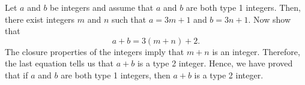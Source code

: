 \begin{list}{\bf{\ref{exer:sec12-typeproof}.}}
\item \begin{list}{\bf{(a)}}
\item Let $a$ and $b$ be integers and assume that $a$ and $b$ are both type 1 integers.  Then, there exist integers $m$ and $n$ such that $a = 3m + 1$ and $b = 3n + 1$.  Now show that
\[
a + b = 3 \left( m + n \right) + 2.
\]
The closure properties of the integers imply that $m + n$ is an integer.  Therefore, the last equation tells us that $a + b$ is a type 2 integer.  Hence, we have proved that if $a$ and $b$ are both type 1 integers, then $a + b$ is a type 2 integer.
\end{list}
\end{list}


%
%
%
%



